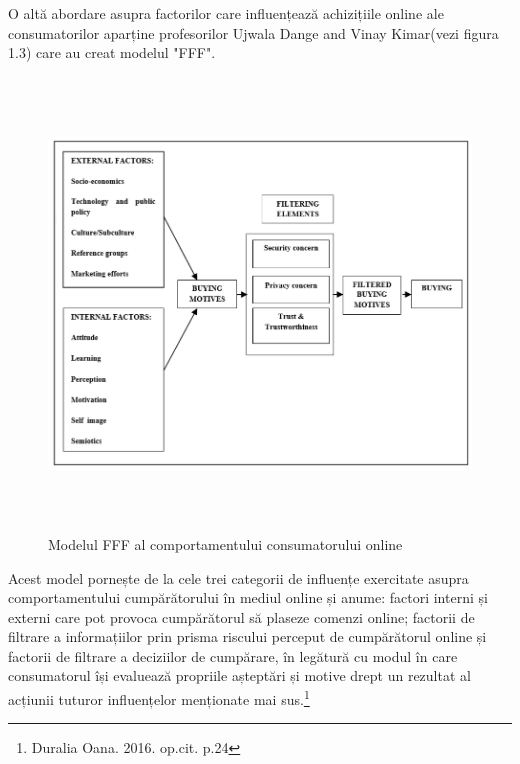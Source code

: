 \documentclass[a4paper, 12pt]{article}
\begin{document}
	\quad  O altă abordare asupra factorilor care influențează achizițiile online ale consumatorilor aparține profesorilor Ujwala Dange and Vinay Kimar(vezi figura 1.3) care au creat modelul "FFF". 
	\begin{figure}[!htb]
		\centering
		\includegraphics[width=15cm, height=12cm]{"figures/SECOND.png"}
		\caption{Modelul FFF al comportamentului consumatorului online}\label{fig:second}
	\end{figure}
\newpage
	\quad Acest model pornește de la cele trei categorii de influențe exercitate asupra comportamentului cumpărătorului în mediul online și anume: factori interni și externi care pot provoca cumpărătorul să plaseze comenzi online; factorii de filtrare a informațiilor prin prisma riscului perceput de cumpărătorul online și factorii de filtrare a deciziilor de cumpărare, în legătură cu modul în care consumatorul își evaluează propriile așteptări și motive drept un rezultat al acțiunii tuturor influențelor menționate mai sus.\footnote{Duralia Oana. 2016. op.cit. p.24}
	
\end{document}

